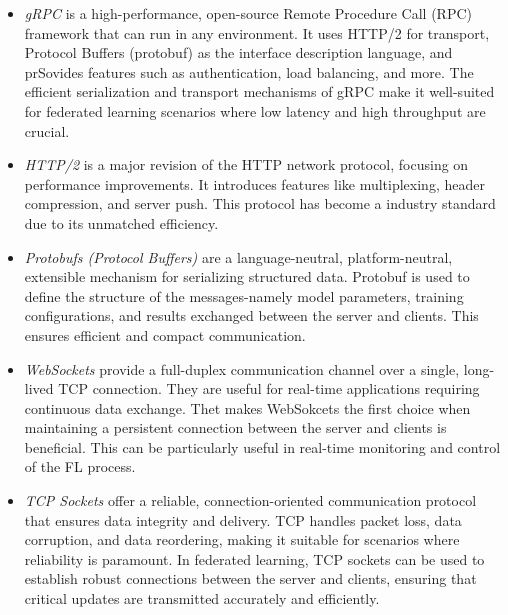 \begin{itemize}
    \item \emph{gRPC} is a high-performance, open-source Remote Procedure Call (RPC) framework that can run in any environment.
          It uses HTTP/2 for transport, Protocol Buffers (protobuf) as the interface description language, and prSovides features such as
          authentication, load balancing, and more. The efficient serialization and transport mechanisms of gRPC make it well-suited for
          federated learning scenarios where low latency and high throughput are crucial.

    \item \emph{HTTP/2} is a major revision of the HTTP network protocol, focusing on performance improvements. It introduces features
          like multiplexing, header compression, and server push. This protocol has become a industry standard due to its unmatched efficiency.

    \item \emph{Protobufs (Protocol Buffers)} are a language-neutral, platform-neutral, extensible mechanism for serializing structured data.
          Protobuf is used to define the structure of the messages-namely model parameters, training configurations, and results exchanged
          between the server and clients. This ensures efficient and compact communication.

    \item \emph{WebSockets} provide a full-duplex communication channel over a single, long-lived TCP connection. They are useful
          for real-time applications requiring continuous data exchange. Thet makes WebSokcets the first choice when maintaining a persistent
          connection between the server and clients is beneficial. This can be particularly useful in real-time monitoring and control of the
          FL process.

    \item \emph{TCP Sockets} offer a reliable, connection-oriented communication protocol that ensures data integrity and delivery.
          TCP handles packet loss, data corruption, and data reordering, making it suitable for scenarios where reliability is paramount.
          In federated learning, TCP sockets can be used to establish robust connections between the server and clients, ensuring that
          critical updates are transmitted accurately and efficiently.

\end{itemize}

